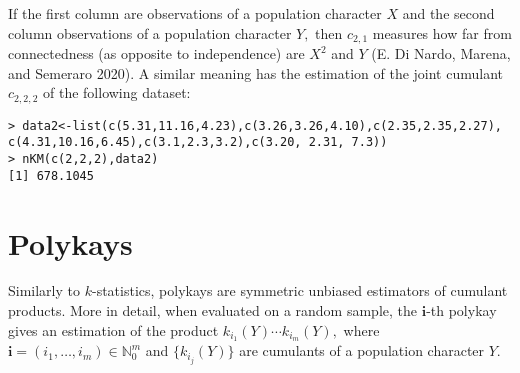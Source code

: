 If the first column are observations of a population character \(X\) and the second column observations of a population character \(Y,\) then \(c_{2,1}\) measures how far from connectedness (as opposite to independence) are \(X^2\) and \(Y\) (E. Di Nardo, Marena, and Semeraro 2020). A similar meaning has the estimation of the joint cumulant \(c_{2,2,2}\) of the following dataset:

\begin{verbatim}
> data2<-list(c(5.31,11.16,4.23),c(3.26,3.26,4.10),c(2.35,2.35,2.27),
c(4.31,10.16,6.45),c(3.1,2.3,3.2),c(3.20, 2.31, 7.3))
> nKM(c(2,2,2),data2)
[1] 678.1045
\end{verbatim}

\hypertarget{polykays}{%
\section{Polykays}\label{polykays}}

Similarly to \(k\)-statistics, polykays are symmetric unbiased estimators of cumulant products. More in detail, when evaluated on a random sample, the \(\boldsymbol{i}\)-th polykay gives an estimation of the product \(k_{i_1}(Y) \cdots k_{i_m}(Y),\) where \(\boldsymbol{i} = (i_1, \ldots, i_m) \in {\mathbb N}_0^m\) and \(\{k_{i_j}(Y)\}\) are cumulants of a population character \(Y.\)

